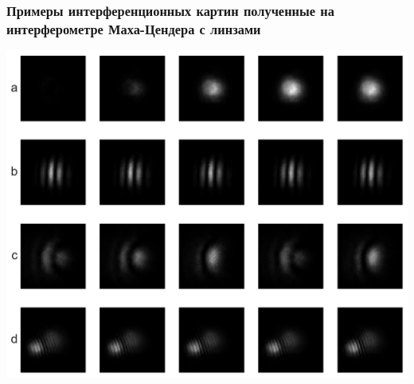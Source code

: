 \begin{frame}
    \frametitle{Примеры интерференционных картин полученные на интерферометре Маха-Цендера с линзами}
    \centering
    \includegraphics[width=0.8\linewidth]{images/Env_patterns.pdf}
\end{frame}


